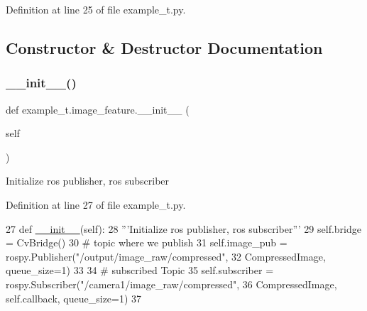 Definition at line 25 of file example\+\_\+t.\+py.



\subsection{Constructor \& Destructor Documentation}
\mbox{\label{classexample__t_1_1image__feature_ab7ca3d6ed3e0a021664f3227a389914b}} 
\subsubsection{\texorpdfstring{\+\_\+\+\_\+init\+\_\+\+\_\+()}{\_\_init\_\_()}\hspace{0.1cm}{\footnotesize\ttfamily [1/2]}}
{\footnotesize\ttfamily def example\+\_\+t.\+image\+\_\+feature.\+\_\+\+\_\+init\+\_\+\+\_\+ (\begin{DoxyParamCaption}\item[{}]{self }\end{DoxyParamCaption})}

\begin{DoxyVerb}Initialize ros publisher, ros subscriber\end{DoxyVerb}
 

Definition at line 27 of file example\+\_\+t.\+py.


\begin{DoxyCode}
27     \textcolor{keyword}{def }\hyperlink{classstate__machine_1_1Play_a5993a23d8be7f7b2647f71ede0334957}{\_\_init\_\_}(self):
28         \textcolor{stringliteral}{'''Initialize ros publisher, ros subscriber'''}
29         self.bridge = CvBridge()
30         \textcolor{comment}{# topic where we publish}
31         self.image\_pub = rospy.Publisher(\textcolor{stringliteral}{"/output/image\_raw/compressed"},
32                                          CompressedImage, queue\_size=1)
33 
34         \textcolor{comment}{# subscribed Topic}
35         self.subscriber = rospy.Subscriber(\textcolor{stringliteral}{"/camera1/image\_raw/compressed"},
36                                            CompressedImage, self.callback,  queue\_size=1)
37 
\end{DoxyCode}
\mbox{\label{classexample__t_1_1image__feature_ab7ca3d6ed3e0a021664f3227a389914b}} 
